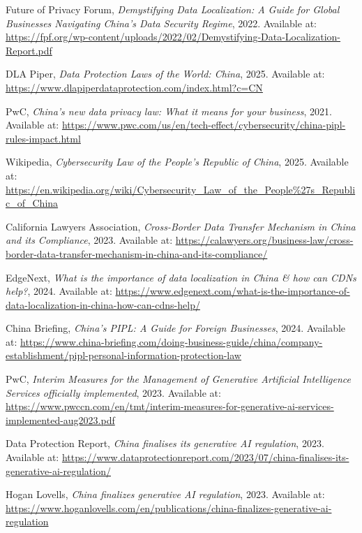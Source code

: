 \documentclass[11pt, a4paper, oneside]{article}
\begin{document}
\begin{thebibliography}{99}
    Future of Privacy Forum, \textit{Demystifying Data Localization: A Guide for Global Businesses Navigating China's Data Security Regime}, 2022. Available at: \url{https://fpf.org/wp-content/uploads/2022/02/Demystifying-Data-Localization-Report.pdf}

    DLA Piper, \textit{Data Protection Laws of the World: China}, 2025. Available at: \url{https://www.dlapiperdataprotection.com/index.html?c=CN}

    PwC, \textit{China's new data privacy law: What it means for your business}, 2021. Available at: \url{https://www.pwc.com/us/en/tech-effect/cybersecurity/china-pipl-rules-impact.html}

    Wikipedia, \textit{Cybersecurity Law of the People's Republic of China}, 2025. Available at: \url{https://en.wikipedia.org/wiki/Cybersecurity_Law_of_the_People%27s_Republic_of_China}

    California Lawyers Association, \textit{Cross-Border Data Transfer Mechanism in China and its Compliance}, 2023. Available at: \url{https://calawyers.org/business-law/cross-border-data-transfer-mechanism-in-china-and-its-compliance/}

    EdgeNext, \textit{What is the importance of data localization in China \& how can CDNs help?}, 2024. Available at: \url{https://www.edgenext.com/what-is-the-importance-of-data-localization-in-china-how-can-cdns-help/}

    China Briefing, \textit{China's PIPL: A Guide for Foreign Businesses}, 2024. Available at: \url{https://www.china-briefing.com/doing-business-guide/china/company-establishment/pipl-personal-information-protection-law}

    PwC, \textit{Interim Measures for the Management of Generative Artificial Intelligence Services officially implemented}, 2023. Available at: \url{https://www.pwccn.com/en/tmt/interim-measures-for-generative-ai-services-implemented-aug2023.pdf}

    Data Protection Report, \textit{China finalises its generative AI regulation}, 2023. Available at: \url{https://www.dataprotectionreport.com/2023/07/china-finalises-its-generative-ai-regulation/}

    Hogan Lovells, \textit{China finalizes generative AI regulation}, 2023. Available at: \url{https://www.hoganlovells.com/en/publications/china-finalizes-generative-ai-regulation}

\end{thebibliography}
\end{document}
